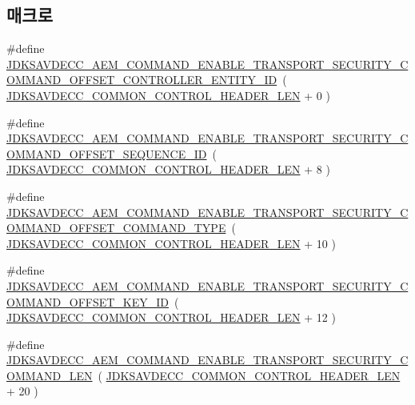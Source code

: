 \subsection*{매크로}
\begin{DoxyCompactItemize}
\item 
\#define \hyperlink{group__command__enable__transport__security_ga0f4b8fb28d03dcd55e740d9dc352c0ab}{J\+D\+K\+S\+A\+V\+D\+E\+C\+C\+\_\+\+A\+E\+M\+\_\+\+C\+O\+M\+M\+A\+N\+D\+\_\+\+E\+N\+A\+B\+L\+E\+\_\+\+T\+R\+A\+N\+S\+P\+O\+R\+T\+\_\+\+S\+E\+C\+U\+R\+I\+T\+Y\+\_\+\+C\+O\+M\+M\+A\+N\+D\+\_\+\+O\+F\+F\+S\+E\+T\+\_\+\+C\+O\+N\+T\+R\+O\+L\+L\+E\+R\+\_\+\+E\+N\+T\+I\+T\+Y\+\_\+\+ID}~( \hyperlink{group__jdksavdecc__avtp__common__control__header_gaae84052886fb1bb42f3bc5f85b741dff}{J\+D\+K\+S\+A\+V\+D\+E\+C\+C\+\_\+\+C\+O\+M\+M\+O\+N\+\_\+\+C\+O\+N\+T\+R\+O\+L\+\_\+\+H\+E\+A\+D\+E\+R\+\_\+\+L\+EN} + 0 )
\item 
\#define \hyperlink{group__command__enable__transport__security_ga7d968d5fde7123ae86f986c643bb3d23}{J\+D\+K\+S\+A\+V\+D\+E\+C\+C\+\_\+\+A\+E\+M\+\_\+\+C\+O\+M\+M\+A\+N\+D\+\_\+\+E\+N\+A\+B\+L\+E\+\_\+\+T\+R\+A\+N\+S\+P\+O\+R\+T\+\_\+\+S\+E\+C\+U\+R\+I\+T\+Y\+\_\+\+C\+O\+M\+M\+A\+N\+D\+\_\+\+O\+F\+F\+S\+E\+T\+\_\+\+S\+E\+Q\+U\+E\+N\+C\+E\+\_\+\+ID}~( \hyperlink{group__jdksavdecc__avtp__common__control__header_gaae84052886fb1bb42f3bc5f85b741dff}{J\+D\+K\+S\+A\+V\+D\+E\+C\+C\+\_\+\+C\+O\+M\+M\+O\+N\+\_\+\+C\+O\+N\+T\+R\+O\+L\+\_\+\+H\+E\+A\+D\+E\+R\+\_\+\+L\+EN} + 8 )
\item 
\#define \hyperlink{group__command__enable__transport__security_gac647a7e67498053440c0246a22ae78ca}{J\+D\+K\+S\+A\+V\+D\+E\+C\+C\+\_\+\+A\+E\+M\+\_\+\+C\+O\+M\+M\+A\+N\+D\+\_\+\+E\+N\+A\+B\+L\+E\+\_\+\+T\+R\+A\+N\+S\+P\+O\+R\+T\+\_\+\+S\+E\+C\+U\+R\+I\+T\+Y\+\_\+\+C\+O\+M\+M\+A\+N\+D\+\_\+\+O\+F\+F\+S\+E\+T\+\_\+\+C\+O\+M\+M\+A\+N\+D\+\_\+\+T\+Y\+PE}~( \hyperlink{group__jdksavdecc__avtp__common__control__header_gaae84052886fb1bb42f3bc5f85b741dff}{J\+D\+K\+S\+A\+V\+D\+E\+C\+C\+\_\+\+C\+O\+M\+M\+O\+N\+\_\+\+C\+O\+N\+T\+R\+O\+L\+\_\+\+H\+E\+A\+D\+E\+R\+\_\+\+L\+EN} + 10 )
\item 
\#define \hyperlink{group__command__enable__transport__security_ga38cd48d98995364e8216e71475610fb0}{J\+D\+K\+S\+A\+V\+D\+E\+C\+C\+\_\+\+A\+E\+M\+\_\+\+C\+O\+M\+M\+A\+N\+D\+\_\+\+E\+N\+A\+B\+L\+E\+\_\+\+T\+R\+A\+N\+S\+P\+O\+R\+T\+\_\+\+S\+E\+C\+U\+R\+I\+T\+Y\+\_\+\+C\+O\+M\+M\+A\+N\+D\+\_\+\+O\+F\+F\+S\+E\+T\+\_\+\+K\+E\+Y\+\_\+\+ID}~( \hyperlink{group__jdksavdecc__avtp__common__control__header_gaae84052886fb1bb42f3bc5f85b741dff}{J\+D\+K\+S\+A\+V\+D\+E\+C\+C\+\_\+\+C\+O\+M\+M\+O\+N\+\_\+\+C\+O\+N\+T\+R\+O\+L\+\_\+\+H\+E\+A\+D\+E\+R\+\_\+\+L\+EN} + 12 )
\item 
\#define \hyperlink{group__command__enable__transport__security_ga961cd8b2adbf6a8034688007a757eb5e}{J\+D\+K\+S\+A\+V\+D\+E\+C\+C\+\_\+\+A\+E\+M\+\_\+\+C\+O\+M\+M\+A\+N\+D\+\_\+\+E\+N\+A\+B\+L\+E\+\_\+\+T\+R\+A\+N\+S\+P\+O\+R\+T\+\_\+\+S\+E\+C\+U\+R\+I\+T\+Y\+\_\+\+C\+O\+M\+M\+A\+N\+D\+\_\+\+L\+EN}~( \hyperlink{group__jdksavdecc__avtp__common__control__header_gaae84052886fb1bb42f3bc5f85b741dff}{J\+D\+K\+S\+A\+V\+D\+E\+C\+C\+\_\+\+C\+O\+M\+M\+O\+N\+\_\+\+C\+O\+N\+T\+R\+O\+L\+\_\+\+H\+E\+A\+D\+E\+R\+\_\+\+L\+EN} + 20 )
\end{DoxyCompactItemize}
